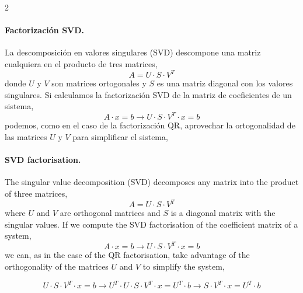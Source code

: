 \begin{paracol}{2}
\paragraph{Factorización SVD.} La descomposición en valores singulares (SVD) descompone una matriz cualquiera en el producto de tres matrices,
\begin{equation*}
A=U\cdot S\cdot V^T
\end{equation*}
donde $U$ y $V$ son matrices ortogonales y $S$ es una matriz diagonal con los valores singulares. Si calculamos la factorización SVD de la matriz de coeficientes de un sistema,
\begin{equation*}
A\cdot x=b \rightarrow U\cdot S\cdot V^T\cdot x=b
\end{equation*}
podemos, como en el caso de la factorización QR, aprovechar la ortogonalidad de las matrices $U$ y $V$ para simplificar el sistema,

\switchcolumn
\paragraph{SVD factorisation.} The singular value decomposition (SVD) decomposes any matrix into the product of three matrices,
\begin{equation*}
A=U\cdot S\cdot V^T
\end{equation*}
where $U$ and $V$ are orthogonal matrices and $S$ is a diagonal matrix with the singular values. If we compute the SVD factorisation of the coefficient matrix of a system,
\begin{equation*}
A\cdot x=b \rightarrow U\cdot S\cdot V^T\cdot x=b
\end{equation*}
we can, as in the case of the QR factorisation, take advantage of the orthogonality of the matrices $U$ and $V$ to simplify the system,
\end{paracol}

\begin{equation*}
U\cdot S\cdot V^T\cdot x=b \rightarrow U^T\cdot U\cdot S\cdot V^T \cdot x= U^T\cdot b \rightarrow S\cdot V^T \cdot x=U^T\cdot b
\end{equation*}

